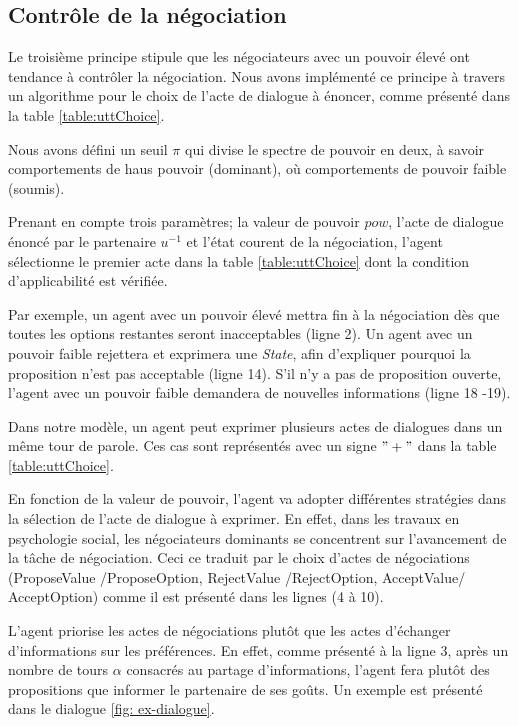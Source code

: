	\subsection{Contrôle de la négociation}
	
		Le troisième principe stipule que les négociateurs avec un pouvoir élevé ont tendance à contrôler la négociation.
		Nous avons implémenté ce principe à travers un algorithme pour le choix de l'acte de dialogue à énoncer, comme présenté dans la table \ref{table:uttChoice}.

		Nous avons défini un seuil $\pi$  qui divise le spectre de pouvoir en deux, à savoir comportements de haus pouvoir (dominant), où comportements de pouvoir faible (soumis).

		Prenant en compte trois paramètres; la valeur de pouvoir $pow$, l'acte de dialogue énoncé par le partenaire $u^{-1}$ et l'état courent de la négociation, l'agent sélectionne le premier acte dans la table \ref{table:uttChoice} dont la condition d'applicabilité est vérifiée.  
	
		
		Par exemple, un agent avec un pouvoir élevé mettra fin à la négociation dès que toutes les options restantes seront inacceptables (ligne 2). Un agent avec un pouvoir faible rejettera et exprimera une \emph{State}, afin d'expliquer pourquoi la proposition n'est pas acceptable (ligne 14). S'il n'y a pas de proposition ouverte, l'agent avec un pouvoir faible demandera de nouvelles informations (ligne 18 -19).
	
		Dans notre modèle, un agent peut exprimer plusieurs actes de dialogues dans un même tour de parole. Ces cas sont représentés avec un signe $"+"$ dans la table \ref{table:uttChoice}.
	
		En fonction de la valeur de pouvoir, l'agent va adopter différentes stratégies dans la sélection de l'acte de dialogue à exprimer. En effet, dans les travaux en psychologie social, les négociateurs dominants se concentrent sur l'avancement de la tâche de négociation. Ceci ce traduit par le choix d'actes de négociations (ProposeValue /ProposeOption, RejectValue /RejectOption, AcceptValue/ AcceptOption) comme il est présenté dans les lignes (4 à 10).
		
		L'agent priorise les actes de négociations plutôt que les actes d'échanger d'informations sur les préférences. En effet, comme présenté à la ligne 3, après un nombre de tours $ \alpha $ consacrés au partage d'informations, l'agent fera plutôt des propositions que informer le partenaire de ses goûts. Un exemple est présenté dans le dialogue \ref{fig: ex-dialogue}.
	
